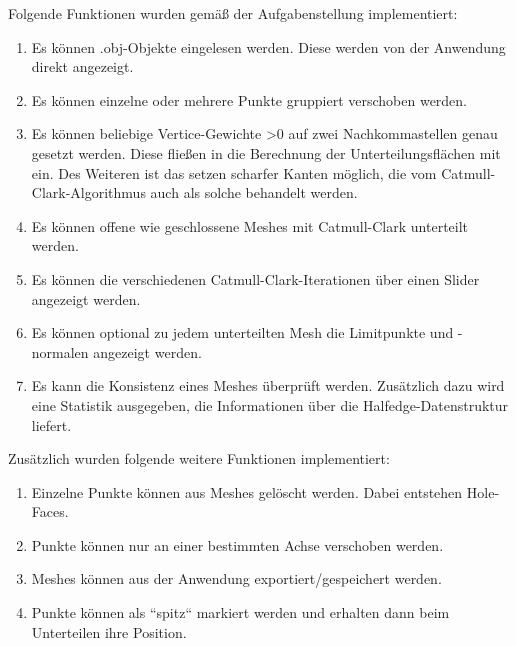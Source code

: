 Folgende Funktionen wurden gemä\ss{} der Aufgabenstellung implementiert:
\begin{enumerate}
\item Es können .obj-Objekte eingelesen werden. Diese werden von der Anwendung direkt angezeigt.
\item Es können einzelne oder mehrere Punkte gruppiert verschoben werden. 
\item Es können beliebige Vertice-Gewichte >0 auf zwei Nachkommastellen genau gesetzt werden. Diese flie\ss{}en in die Berechnung der Unterteilungsflächen mit ein. 
Des Weiteren ist das setzen scharfer Kanten möglich, die vom Catmull-Clark-Algorithmus auch als solche behandelt werden.
\item Es können offene wie geschlossene Meshes mit Catmull-Clark unterteilt werden. 
\item Es können die verschiedenen Catmull-Clark-Iterationen über einen Slider angezeigt werden. 
\item Es können optional zu jedem unterteilten Mesh die Limitpunkte und -normalen angezeigt werden.
\item Es kann die Konsistenz eines Meshes überprüft werden. Zusätzlich dazu wird eine Statistik ausgegeben, die Informationen über die Halfedge-Datenstruktur liefert. 
\end{enumerate}

Zusätzlich wurden folgende weitere Funktionen implementiert:
\begin{enumerate}
\item Einzelne Punkte können aus Meshes gelöscht werden. Dabei entstehen Hole-Faces.
\item Punkte können nur an einer bestimmten Achse verschoben werden.
\item Meshes können aus der Anwendung exportiert/gespeichert werden.
\item Punkte können als ``spitz`` markiert werden und erhalten dann beim Unterteilen ihre Position.
\end{enumerate}